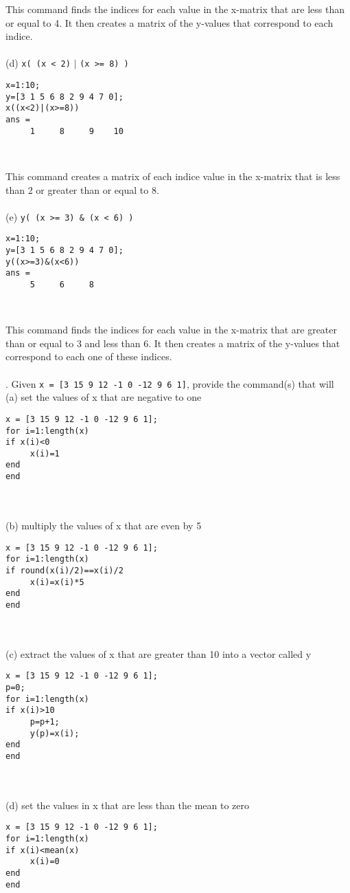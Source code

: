 \documentclass [12pt] {article}
\begin{document}
\par This command finds the indices for each value in the x-matrix that are less than or equal to 4. It then creates a matrix of the y-values that correspond to each indice. \\
\\\indent(d) \verb|x( (x < 2)| $\mid$ \verb|(x >= 8) )| 
\indent \begin{Verbatim}[xleftmargin=.5in]
x=1:10;
y=[3 1 5 6 8 2 9 4 7 0];
x((x<2)|(x>=8))
ans =
     1     8     9    10
\end{Verbatim} \\ 
\par This command creates a matrix of each indice value in the x-matrix that is less than 2 or greater than or equal to 8. \\
\\\indent(e) \verb|y( (x >= 3) & (x < 6) )| 
\indent \begin{Verbatim}[xleftmargin=.5in]
x=1:10;
y=[3 1 5 6 8 2 9 4 7 0];
y((x>=3)&(x<6))
ans =
     5     6     8
\end{Verbatim} \\ 
\par This command finds the indices for each value in the x-matrix that are greater than or equal to 3 and less than 6. It then creates a matrix of the y-values that correspond to each one of these indices.\\\\ . Given \verb|x = [3 15 9 12 -1 0 -12 9 6 1]|, provide the command(s) that will
\\\indent(a) set the values of x that are negative to one \\
\indent \begin{Verbatim}[xleftmargin=.5in]
x = [3 15 9 12 -1 0 -12 9 6 1];
for i=1:length(x)
if x(i)<0
     x(i)=1
end
end
\end{Verbatim} \\ 
\\\indent(b) multiply the values of x that are even by 5 \\
\indent \begin{Verbatim}[xleftmargin=.5in]
x = [3 15 9 12 -1 0 -12 9 6 1];
for i=1:length(x)
if round(x(i)/2)==x(i)/2
     x(i)=x(i)*5
end
end
\end{Verbatim} \\ 
\\\indent(c) extract the values of x that are greater than 10 into a vector called y \\
\indent \begin{Verbatim}[xleftmargin=.5in]
x = [3 15 9 12 -1 0 -12 9 6 1];
p=0;
for i=1:length(x)
if x(i)>10
     p=p+1;
     y(p)=x(i);
end
end
\end{Verbatim} \\ 
\\\indent(d) set the values in x that are less than the mean to zero \\
\indent \begin{Verbatim}[xleftmargin=.5in]
x = [3 15 9 12 -1 0 -12 9 6 1];
for i=1:length(x)
if x(i)<mean(x)
     x(i)=0
end
end
\end{Verbatim} \\ 
\end{document}
